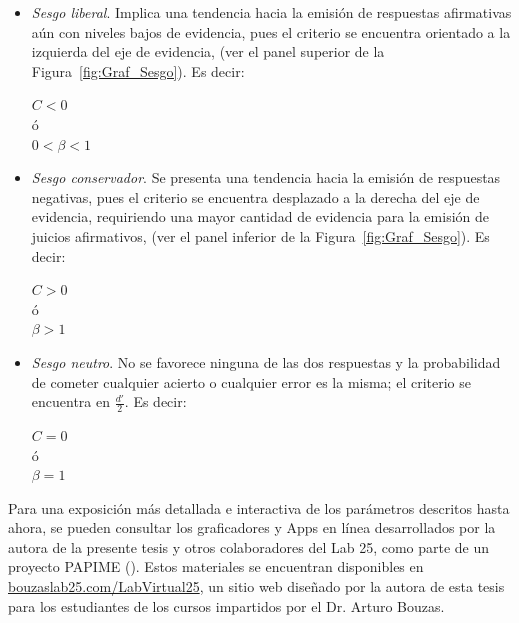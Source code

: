 \begin{itemize}
\item \textsl{Sesgo liberal}. Implica una tendencia hacia la emisión de respuestas afirmativas aún con niveles bajos de evidencia, pues el criterio se encuentra orientado a la izquierda del eje de evidencia, (ver el panel superior de la Figura~\ref{fig:Graf_Sesgo}). Es decir: \\
\begin{center}
$C < 0$\\
ó\\
$0 < \beta < 1$\\
\end{center}

\item \textsl{Sesgo conservador}. Se presenta una tendencia hacia la emisión de respuestas negativas, pues el criterio se encuentra desplazado a la derecha del eje de evidencia, requiriendo una mayor cantidad de evidencia para la emisión de juicios afirmativos, (ver el panel inferior de la Figura~\ref{fig:Graf_Sesgo}). Es decir: \\
\begin{center}
$C > 0$\\
ó\\
$\beta > 1$\\
\end{center}

\item \textsl{Sesgo neutro}. No se favorece ninguna de las dos respuestas y la probabilidad de cometer cualquier acierto o cualquier error es la misma; el criterio se encuentra en $\frac{d'}{2}$. Es decir: \\
\begin{center}
$C = 0$\\
ó\\
$\beta = 1$\\
\end{center}
\end{itemize}

Para una exposición más detallada e interactiva de los parámetros descritos hasta ahora, se pueden consultar los graficadores y Apps en línea desarrollados por la autora de la presente tesis y otros colaboradores del Lab 25, como parte de un proyecto PAPIME (\citeyear{PAPIME}). Estos materiales se encuentran disponibles en \href{http://www.bouzaslab25.com/LabVirtual25/}{bouzaslab25.com/LabVirtual25}, un sitio web diseñado por la autora de esta tesis para los estudiantes de los cursos impartidos por el Dr. Arturo Bouzas.\\

